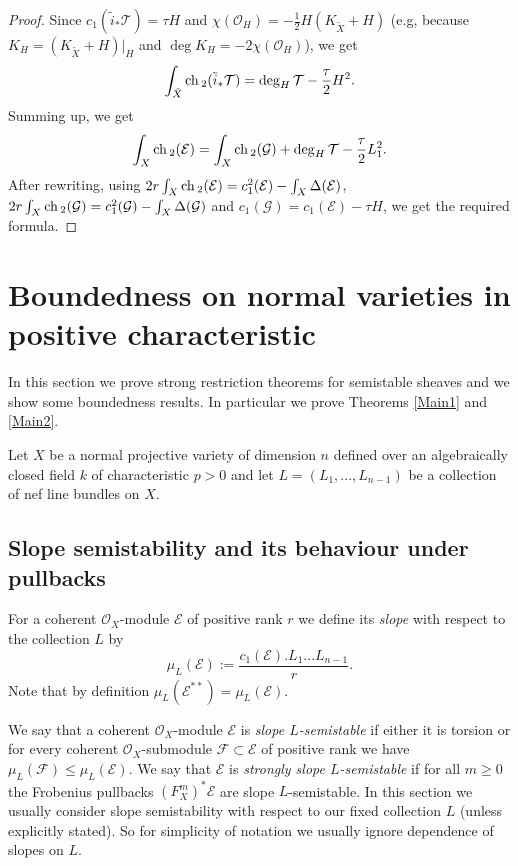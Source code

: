\documentclass[12pt]{article}
\theoremstyle{plain}
\theoremstyle{definition}
\theoremstyle{remark}
\newcommand{\cE}{{\mathcal E}}
\newcommand{\cF}{{\mathcal F}}
\newcommand{\cG}{{\mathcal G}}
\newcommand{\cO}{{\mathcal O}}
\newcommand{\cT}{{\mathcal T}}
\newcommand{\ch}{{\mathop{\rm ch \, }}}
\begin{document}
\begin{proof}
	Since $c_1(\tilde i_* \cT)= \tau H$ and $ \chi (\cO_H)=-\frac {1}{2}H(K_{\tilde X}+H)$ (e.g, because $K_H=(K_{\tilde X}+H)|_H$ and $\deg K_H=-2 \chi (\cO_H)$), we get 
	$$ \int _{\tilde X} \ch_2 (\tilde i_*\cT)=\deg _H \cT -\frac {\tau}{2}H^2.$$
	Summing up, we get
	\begin{align*}
		\int _X \ch_2 (\cE)	=\int _X \ch_2 (\cG)+\deg _H \cT-\frac {\tau}{2}L_1^2.
	\end{align*}
	After rewriting, using $2r \int _X \ch_2 (\cE)	=  c_1^2(
	\cE)-{\int_X \Delta (\cE)}$, $2r \int _X \ch_2 (\cG)	=  c_1^2(
	\cG)-{\int_X \Delta (\cG)}$ and $c_1 (\cG)= c_1 (\cE)-\tau H$, we get the required formula.
\end{proof}

\section{Boundedness on normal varieties in positive characteristic}

In this section we prove strong restriction theorems for semistable sheaves and we show some boundedness results.  In particular we prove Theorems \ref{Main1} and \ref{Main2}.


Let $X$ be a normal projective variety of dimension $n$ defined over an algebraically closed field $k$ of characteristic $p>0$ and let $L=(L_1,...,L_{n-1})$ be a collection of nef line bundles on $X$. 

\subsection{Slope semistability and its behaviour under pullbacks}\label{Subsection:beta}

For a coherent $\cO_X$-module $\cE$ of positive rank $r$ we define its \emph{slope} with respect to the collection $L$ by
$$\mu_L(\cE):= \frac{c_1(\cE). L_1...L_{n-1}}{r}.$$
Note that by definition $\mu _L(\cE ^{**})= \mu _L(\cE)$.

We say that a coherent $\cO_X$-module $\cE$ is \emph{slope $L$-semistable} if either it is torsion
or for every coherent $\cO_X$-submodule $\cF\subset \cE$
of positive rank we have $\mu_L(\cF)\le \mu_L(\cE)$. We say that $\cE$ is \emph{strongly slope $L$-semistable} if for all $m\ge 0$ the Frobenius pullbacks $(F_X^m)^*\cE$ are slope $L$-semistable.
In this section we usually consider slope semistability with respect to our fixed collection $L$ (unless explicitly stated). So for simplicity of notation we usually ignore dependence of slopes on $L$. 
\end{document}
